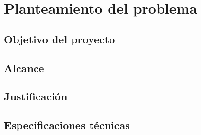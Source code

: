\chapter{Planteamiento del problema}

\section{Objetivo del proyecto}

\section{Alcance}

\section{Justificación}

\section{Especificaciones técnicas}